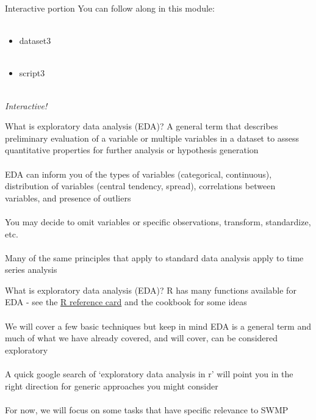 \documentclass[xcolor=svgnames]{beamer}\usepackage[]{graphicx}\usepackage[]{color}
\begin{document}
\begin{frame}{Interactive portion}
You can follow along in this module: \\~\\
\begin{itemize}
\item dataset3 \\~\\
\item script3 \\~\\
\end{itemize}
\Large
\centerline{\emph{Interactive!}}
\end{frame}

\begin{frame}{What is exploratory data analysis (EDA)?}
A general term that describes preliminary evaluation of a variable or multiple variables in a dataset to assess quantitative properties for further analysis or hypothesis generation\\~\\
EDA can inform you of the \alert{types} of variables (categorical, continuous), \alert{distribution} of variables (central tendency, spread), \alert{correlations} between variables, and presence of \alert{outliers} \\~\\
You may decide to omit variables or specific observations, transform, standardize, etc.\\~\\
Many of the same principles that apply to standard data analysis apply to time series analysis
\end{frame}

\begin{frame}{What is exploratory data analysis (EDA)?}
R has many functions available for EDA - see the \href{http://cran.r-project.org/doc/contrib/Short-refcard.pdf}{R reference card} and the cookbook for some ideas\\~\\
We will cover a few basic techniques but keep in mind EDA is a general term and much of what we have already covered, and will cover, can be considered exploratory \\~\\
A quick google search of `exploratory data analysis in r' will point you in the right direction for generic approaches you might consider \\~\\
For now, we will focus on some tasks that have specific relevance to SWMP
\end{frame}
\end{document}
